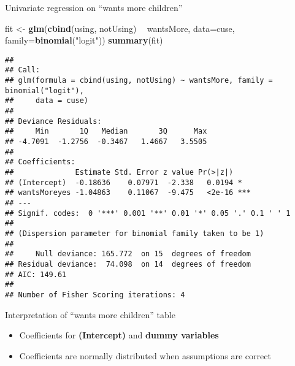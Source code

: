 \documentclass[
  ignorenonframetext,
]{beamer}
\newenvironment{Shaded}{\begin{snugshade}}{\end{snugshade}}
\newcommand{\DataTypeTok}[1]{\textcolor[rgb]{0.13,0.29,0.53}{#1}}
\newcommand{\KeywordTok}[1]{\textcolor[rgb]{0.13,0.29,0.53}{\textbf{#1}}}
\newcommand{\NormalTok}[1]{#1}
\newcommand{\OperatorTok}[1]{\textcolor[rgb]{0.81,0.36,0.00}{\textbf{#1}}}
\newcommand{\StringTok}[1]{\textcolor[rgb]{0.31,0.60,0.02}{#1}}
\providecommand{\tightlist}{%
  \setlength{\itemsep}{0pt}\setlength{\parskip}{0pt}}
\begin{document}
\begin{frame}[fragile]{Univariate regression on ``wants more children''}
\protect\hypertarget{univariate-regression-on-wants-more-children}{}

\tiny

\begin{Shaded}
\begin{Highlighting}[]
\NormalTok{fit <-}\StringTok{ }\KeywordTok{glm}\NormalTok{(}\KeywordTok{cbind}\NormalTok{(using, notUsing) }\OperatorTok{~}\StringTok{ }\NormalTok{wantsMore, }
           \DataTypeTok{data=}\NormalTok{cuse, }\DataTypeTok{family=}\KeywordTok{binomial}\NormalTok{(}\StringTok{"logit"}\NormalTok{))}
\KeywordTok{summary}\NormalTok{(fit)}
\end{Highlighting}
\end{Shaded}

\begin{verbatim}
## 
## Call:
## glm(formula = cbind(using, notUsing) ~ wantsMore, family = binomial("logit"), 
##     data = cuse)
## 
## Deviance Residuals: 
##     Min       1Q   Median       3Q      Max  
## -4.7091  -1.2756  -0.3467   1.4667   3.5505  
## 
## Coefficients:
##              Estimate Std. Error z value Pr(>|z|)    
## (Intercept)  -0.18636    0.07971  -2.338   0.0194 *  
## wantsMoreyes -1.04863    0.11067  -9.475   <2e-16 ***
## ---
## Signif. codes:  0 '***' 0.001 '**' 0.01 '*' 0.05 '.' 0.1 ' ' 1
## 
## (Dispersion parameter for binomial family taken to be 1)
## 
##     Null deviance: 165.772  on 15  degrees of freedom
## Residual deviance:  74.098  on 14  degrees of freedom
## AIC: 149.61
## 
## Number of Fisher Scoring iterations: 4
\end{verbatim}

\end{frame}

\begin{frame}{Interpretation of ``wants more children'' table}
\protect\hypertarget{interpretation-of-wants-more-children-table}{}

\begin{itemize}
\tightlist
\item
  Coefficients for \textbf{(Intercept)} and \textbf{dummy variables}
\item
  Coefficients are normally distributed when assumptions are correct
\end{itemize}

\end{frame}
\end{document}
